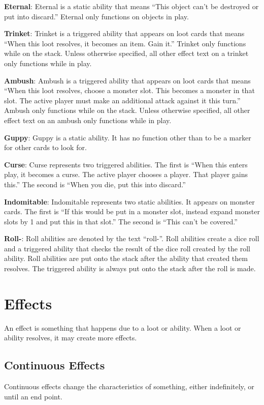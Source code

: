 \documentclass[
  fontsize=10pt,
  paper=a5,
  version=last,
  chapterprefix=true,
  bindingoffset=5mm,
  ]{scrbook}
\begin{document}
    \textbf{Eternal}: Eternal is a static ability that means “This object can’t be destroyed or put into discard.” Eternal only functions on objects in play.
    
    \textbf{Trinket}: Trinket is a triggered ability that appears on loot cards that means “When this loot resolves, it becomes an item. Gain it.” Trinket only functions while on the stack. Unless otherwise specified, all other effect text on a trinket only functions while in play.
    
    \textbf{Ambush}: Ambush is a triggered ability that appears on loot cards that means “When this loot resolves, choose a monster slot. This becomes a monster in that slot. The active player must make an additional attack against it this turn.” Ambush only functions while on the stack. Unless otherwise specified, all other effect text on an ambush only functions while in play.
    
    \textbf{Guppy}: Guppy is a static ability. It has no function other than to be a marker for other cards to look for.
    
    \textbf{Curse}: Curse represents two triggered abilities. The first is “When this enters play, it becomes a curse. The active player chooses a player. That player gains this.” The second is “When you die, put this into discard.”
    
    \textbf{Indomitable}: Indomitable represents two static abilities. It appears on monster cards. The first is “If this would be put in a monster slot, instead expand monster slots by 1 and put this in that slot.” The second is “This can’t be covered.”
    
    \textbf{Roll-}: Roll abilities are denoted by the text “roll-”. Roll abilities create a dice roll and a triggered ability that checks the result of the dice roll created by the roll ability. Roll abilities are put onto the stack after the ability that created them resolves. The triggered ability is always put onto the stack after the roll is made.

    \chapter{Effects}
    \label{effects}
    An effect is something that happens due to a loot or ability. When a loot or ability resolves, it may create more effects.
    
    \section{Continuous Effects}
    Continuous effects change the characteristics of something, either indefinitely, or until an end point.
\end{document}
